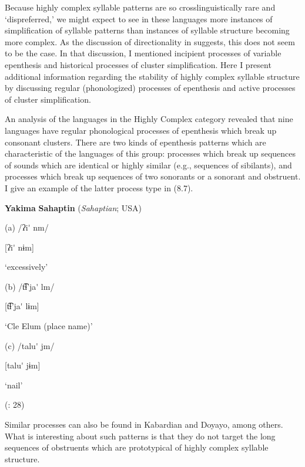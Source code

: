  Because highly complex syllable patterns are so crosslinguistically rare and ‘dispreferred,’ we might expect to see in these languages more instances of simplification of syllable patterns than instances of syllable structure becoming more complex. As the discussion of directionality in  suggests, this does not seem to be the case. In that discussion, I mentioned incipient processes of variable epenthesis and historical processes of cluster simplification. Here I present additional information regarding the stability of highly complex syllable structure by discussing regular (phonologized) processes of epenthesis and active processes of cluster simplification.



  An analysis of the languages in the Highly Complex category revealed that nine languages have regular phonological processes of epenthesis which break up consonant clusters. There are two kinds of epenthesis patterns which are characteristic of the languages of this group: processes which break up sequences of sounds which are identical or highly similar (e.g., sequences of sibilants), and processes which break up sequences of two sonorants or a sonorant and obstruent. I give an example of the latter process type in (8.7).



\ea\label{ex:(8.7)}
  \textbf{Yakima} \textbf{Sahaptin} (\textit{Sahaptian}; USA)



(a)  /ʔi\'{} nm/



  [ʔi\'{} nɨm]



  ‘excessively’



(b)  /t͡ɬ’ja\'{} lm/



  [t͡ɬ’ja\'{} lɨm]



  ‘Cle Elum (place name)’



(c)  /talu\'{} jm/



  [talu\'{} jɨm]



  ‘nail’



(\citealt{HargusBeavert2006}: 28)
\z



Similar processes can also be found in Kabardian and Doyayo, among others. What is interesting about such patterns is that they do not target the long sequences of obstruents which are prototypical of highly complex syllable structure.



